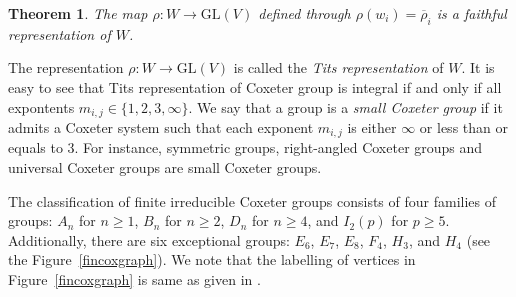 \documentclass[12pt]{amsart}
\newtheorem{theorem}[equation]{Theorem}
\theoremstyle{definition}
\numberwithin{equation}{section}
\newcommand{\GL}{\mathrm{GL}}
\begin{document}
\begin{theorem}
The map $\rho: W \rightarrow \GL(V)$ defined through $\rho\left(w_{i}\right)=\overline{\rho}_{i}$ is a faithful representation of $W$.
\end{theorem}

The  representation $\rho: W \rightarrow \GL(V)$ is called the {\it Tits representation} of $W$. It is easy to see that Tits representation of Coxeter group is integral if and only if all expontents $m_{i,j}\in\{1,2,3,\infty\}$. We say that a group is a {\it small Coxeter group} if it admits a Coxeter system such that each exponent $m_{i, j}$ is either $\infty$ or less than or equals to 3. For instance, symmetric groups, right-angled Coxeter groups and universal Coxeter groups are small Coxeter groups.
\par

The classification of finite irreducible Coxeter groups consists of four families of groups: $ A_n $ for $ n \geq 1 $, $ B_n $ for $ n \geq 2 $, $ D_n $ for $ n \geq 4 $, and $ I_2(p) $ for $ p \geq 5 $. Additionally, there are six exceptional groups: $ E_6 $, $ E_7 $, $ E_8 $, $ F_4 $, $ H_3 $, and $ H_4 $ (see the Figure~\ref{fincoxgraph}). We note that the labelling of vertices in Figure~\ref{fincoxgraph} is same as given in \cite{Bourbaki}.
\end{document}
